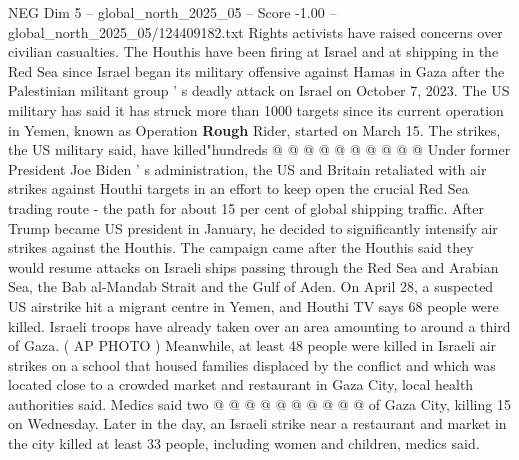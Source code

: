 \begin{textsample}{NEG Dim 5 – global\_north\_2025\_05 – Score -1.00 – global\_north\_2025\_05/124409182.txt}
Rights activists have raised concerns over civilian casualties.
The Houthis have been firing at Israel and at shipping in the Red Sea since Israel began its military offensive against Hamas in Gaza after the Palestinian militant group ' s deadly attack on Israel on October 7, 2023.
The US military has said it has struck more than 1000 targets since its current operation in Yemen, known as Operation \textbf{Rough} Rider, started on March 15.
The strikes, the US military said, have killed"hundreds @ @ @ @ @ @ @ @ @ @ Under former President Joe Biden ' s administration, the US and Britain retaliated with air strikes against Houthi targets in an effort to keep open the crucial Red Sea trading route - the path for about 15 per cent of global shipping traffic.
After Trump became US president in January, he decided to significantly intensify air strikes against the Houthis.
The campaign came after the Houthis said they would resume attacks on Israeli ships passing through the Red Sea and Arabian Sea, the Bab al-Mandab Strait and the Gulf of Aden.
On April 28, a suspected US airstrike hit a migrant centre in Yemen, and Houthi TV says 68 people were killed.
Israeli troops have already taken over an area amounting to around a third of Gaza. ( AP PHOTO ) Meanwhile, at least 48 people were killed in Israeli air strikes on a school that housed families displaced by the conflict and which was located close to a crowded market and restaurant in Gaza City, local health authorities said.
Medics said two @ @ @ @ @ @ @ @ @ @ of Gaza City, killing 15 on Wednesday.
Later in the day, an Israeli strike near a restaurant and market in the city killed at least 33 people, including women and children, medics said.

\end{textsample}
